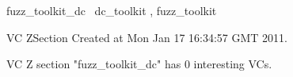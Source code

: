 \documentclass{article}
\begin{document}

\begin{zsection}
	 \SECTION fuzz\_toolkit\_dc \parents~dc\_toolkit , fuzz\_toolkit
\end{zsection}

\newcommand{\appliesTo}{\zbinop{appliesTo}} 
\newcommand{\appliesToNofix}{\zpreop{appliesToNofix}} 

VC ZSection Created at Mon Jan 17 16:34:57 GMT 2011.



 VC Z section "fuzz_toolkit_dc" has $0$ interesting VCs.



\end{document}
